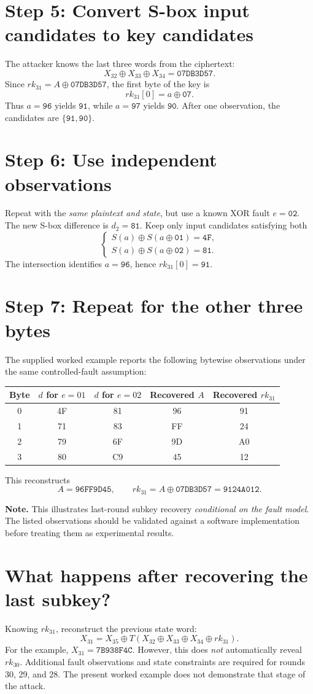 \documentclass[11pt,a4paper]{report}
\newcommand{\hex}[1]{\texttt{#1}}
\newcommand{\xor}{\mathbin{\oplus}}
\newcommand{\note}[1]{\par\smallskip\noindent\colorbox{pale}{\parbox{0.94\linewidth}{\textbf{Note.} #1}}\par\smallskip}
\begin{document}
\section{Step 5: Convert S-box input candidates to key candidates}
The attacker knows the last three words from the ciphertext:
\[X_{32}\xor X_{33}\xor X_{34}=\hex{07DB3D57}.\]
Since \(rk_{31}=A\xor\hex{07DB3D57}\), the first byte of the key is
\[rk_{31}[0]=a\xor\hex{07}.\]
Thus \(a=\hex{96}\) yields \(\hex{91}\), while \(a=\hex{97}\) yields \(\hex{90}\). After one observation, the candidates are \(\{\hex{91},\hex{90}\}\).
\section{Step 6: Use independent observations}
Repeat with the \emph{same plaintext and state}, but use a known XOR fault \(e=\hex{02}\). The new S-box difference is \(d_2=\hex{81}\). Keep only input candidates satisfying both
\[\begin{cases}S(a)\xor S(a\xor\hex{01})=\hex{4F},\\S(a)\xor S(a\xor\hex{02})=\hex{81}.\end{cases}\]
The intersection identifies \(a=\hex{96}\), hence \(rk_{31}[0]=\hex{91}\).
\section{Step 7: Repeat for the other three bytes}
The supplied worked example reports the following bytewise observations under the same controlled-fault assumption:
\begin{center}\begin{tabular}{ccccc}\toprule Byte&\(d\) for \(e=01\)&\(d\) for \(e=02\)&Recovered \(A\)&Recovered \(rk_{31}\)\\\midrule0&4F&81&96&91\\1&71&83&FF&24\\2&79&6F&9D&A0\\3&80&C9&45&12\\\bottomrule\end{tabular}\end{center}
This reconstructs
\[A=\hex{96FF9D45},\qquad rk_{31}=A\xor\hex{07DB3D57}=\boxed{\hex{9124A012}}.\]
\note{This illustrates last-round subkey recovery \emph{conditional on the fault model}. The listed observations should be validated against a software implementation before treating them as experimental results.}
\section{What happens after recovering the last subkey?}
Knowing \(rk_{31}\), reconstruct the previous state word:
\[X_{31}=X_{35}\xor T(X_{32}\xor X_{33}\xor X_{34}\xor rk_{31}).\]
For the example, \(X_{31}=\hex{7B938F4C}\). However, this does \emph{not} automatically reveal \(rk_{30}\). Additional fault observations and state constraints are required for rounds 30, 29, and 28. The present worked example does not demonstrate that stage of the attack.
\end{document}
